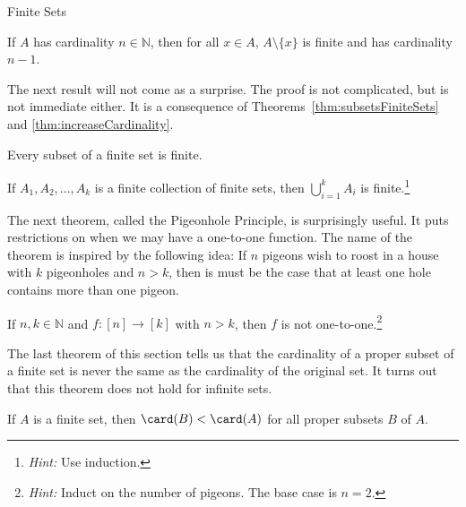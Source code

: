 \begin{section}{Finite Sets}
\begin{theorem}
If $A$ has cardinality $n\in\mathbb{N}$, then for all $x\in A$, $A\setminus \{x\}$ is finite and has cardinality $n-1$. 
\end{theorem}

The next result will not come as a surprise. The proof is not complicated, but is not immediate either. It is a consequence of Theorems~\ref{thm:subsetsFiniteSets} and \ref{thm:increaseCardinality}.

\begin{theorem}
Every subset of a finite set is finite.
\end{theorem}

\begin{theorem}
If $A_1,A_2,\ldots, A_k$ is a finite collection of finite sets, then $\displaystyle \bigcup_{i=1}^k A_i$ is finite.\footnote{\emph{Hint:} Use induction.}
\end{theorem}

The next theorem, called the Pigeonhole Principle, is surprisingly useful. It puts restrictions on when we may have a one-to-one function. The name of the theorem is inspired by the following idea: If $n$ pigeons wish to roost in a house with $k$ pigeonholes and $n>k$, then is must be the case that at least one hole contains more than one pigeon.

\begin{theorem}
If $n,k\in\mathbb{N}$ and $f:[n]\to [k]$ with $n>k$, then $f$ is not one-to-one.\footnote{\emph{Hint:} Induct on the number of pigeons. The base case is $n=2$.}
\end{theorem}

The last theorem of this section tells us that the cardinality of a proper subset of a finite set is never the same as the cardinality of the original set.  It turns out that this theorem does not hold for infinite sets. 

\begin{theorem}
If $A$ is a finite set, then $\card(B)<\card(A)$ for all proper subsets $B$ of $A$.
\end{theorem}

\end{section}